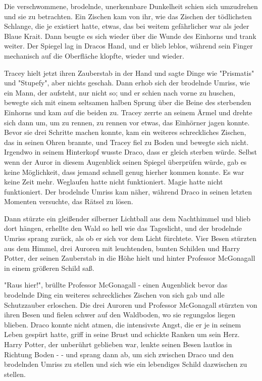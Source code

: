 {Die verschwommene, brodelnde, unerkennbare Dunkelheit schien sich umzudrehen und sie zu betrachten. Ein Zischen kam von ihr, wie das Zischen der tödlichsten Schlange, die je existiert hatte, etwas, das bei weitem gefährlicher war als jeder Blaue Krait. Dann beugte es sich wieder über die Wunde des Einhorns und trank weiter. Der Spiegel lag in Dracos Hand, und er blieb leblos, während sein Finger mechanisch auf die Oberfläche klopfte, wieder und wieder.

Tracey hielt jetzt ihren Zauberstab in der Hand und sagte Dinge wie "Prismatis" und "Stupefy", aber nichts geschah. Dann erhob sich der brodelnde Umriss, wie ein Mann, der aufsteht, nur nicht so; und er schien nach vorne zu huschen, bewegte sich mit einem seltsamen halben Sprung über die Beine des sterbenden Einhorns und kam auf die beiden zu. Tracey zerrte an seinem Ärmel und drehte sich dann um, um zu rennen, zu rennen vor etwas, das Einhörner jagen konnte. Bevor sie drei Schritte machen konnte, kam ein weiteres schreckliches Zischen, das in seinen Ohren brannte, und Tracey fiel zu Boden und bewegte sich nicht. Irgendwo in seinem Hinterkopf wusste Draco, dass er gleich sterben würde. Selbst wenn der Auror in diesem Augenblick seinen Spiegel überprüfen würde, gab es keine Möglichkeit, dass jemand schnell genug hierher kommen konnte. Es war keine Zeit mehr. Weglaufen hatte nicht funktioniert. Magie hatte nicht funktioniert. Der brodelnde Umriss kam näher, während Draco in seinen letzten Momenten versuchte, das Rätsel zu lösen.

Dann stürzte ein gleißender silberner Lichtball aus dem Nachthimmel und blieb dort hängen, erhellte den Wald so hell wie das Tageslicht, und der brodelnde Umriss sprang zurück, als ob er sich vor dem Licht fürchtete. Vier Besen stürzten aus dem Himmel, drei Auroren mit leuchtenden, bunten Schilden und Harry Potter, der seinen Zauberstab in die Höhe hielt und hinter Professor McGonagall in einem größeren Schild saß.

"Raus hier!", brüllte Professor McGonagall - einen Augenblick bevor das brodelnde Ding ein weiteres schreckliches Zischen von sich gab und alle Schutzzauber erloschen. Die drei Auroren und Professor McGonagall stürzten von ihren Besen und fielen schwer auf den Waldboden, wo sie regungslos liegen blieben. Draco konnte nicht atmen, die intensivste Angst, die er je in seinem Leben gespürt hatte, griff in seine Brust und schickte Ranken um sein Herz. Harry Potter, der unberührt geblieben war, lenkte seinen Besen lautlos in Richtung Boden - - und sprang dann ab, um sich zwischen Draco und den brodelnden Umriss zu stellen und sich wie ein lebendiges Schild dazwischen zu stellen.

}
